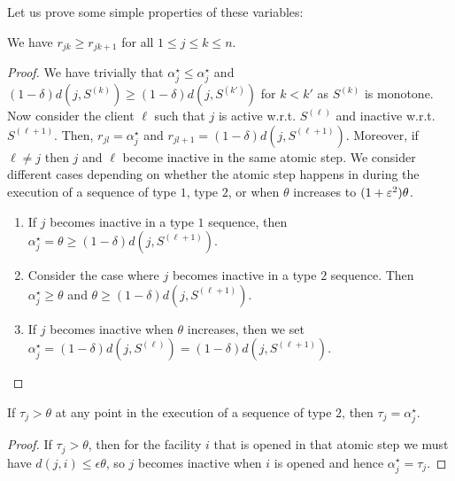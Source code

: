 Let us prove some simple properties of these variables:

\begin{observation}
\label{obs:r-mono-robust}
We have $r_{jk} \geq r_{jk+1}$ for all $1 \leq j \leq k \leq n$.
\end{observation}
\begin{proof}
    We have trivially that $\alpha_j^\star \leq \alpha_j^\star$ and $(1-\delta) d(j, S^{(k)}) \geq (1-\delta) d(j, S^{(k')})$ for $k < k'$ as $S^{(k)}$ is monotone. Now consider the client $\ell$ such that $j$ is active w.r.t. $S^{(\ell)}$ and inactive w.r.t. $S^{(\ell+1)}$. Then, $r_{jl} = \alpha^\star_j$ and $r_{jl+1} = (1-\delta)d(j,S^{(\ell+1)})$. Moreover, if $\ell \neq j$ then $j$ and $\ell$ become inactive in the same atomic step. We consider different cases depending on whether the atomic step happens in during the execution of a sequence of type $1$, type $2$, or when $\theta$ increases to $(1+\varepsilon^2)\theta$.
    \begin{enumerate}
        \item If $j$ becomes inactive in a type $1$ sequence, then $\alpha_j^\star = \theta \ge (1-\delta)d(j,S^{(\ell+1)})$.
        \item Consider the case where $j$ becomes inactive in a type $2$ sequence. Then $\alpha^\star_j \ge \theta$ and  $\theta  \ge (1-\delta)d(j,S^{(\ell+1)})$.
        \item If $j$ becomes inactive when $\theta$ increases, then we set $\alpha^\star_j = (1-\delta)d(j,S^{(\ell)}) = (1-\delta)d(j,S^{(\ell+1)})$.
    \end{enumerate}   
\end{proof}

\begin{observation}
\label{obs:tau}
If $\tau_j > \theta$ at any point in the execution of a sequence of type $2$, then $\tau_j = \alpha_j^\star$.
\end{observation}
\begin{proof}
If $\tau_j > \theta$, then for the facility $i$ that is opened in that atomic step we must have $d(j, i) \leq \epsilon \theta$, so $j$ becomes inactive when $i$ is opened and hence $\alpha_j^\star = \tau_j$.
\end{proof}


